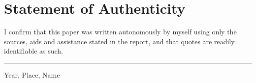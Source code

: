 
\section*{Statement of Authenticity}

I confirm that this paper was written autonomously by myself
using only the sources, aids and assistance stated in the report, and that
quotes are readily identifiable as such.

\vspace*{2cm}

\noindent

\noindent


\noindent
\rule{8cm}{0.1pt}

\noindent
Year, Place, Name

